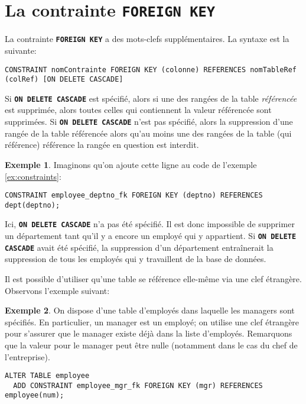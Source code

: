 \documentclass[a4paper, 12pt]{report}
\newcommand{\textSQL}[1]{\texttt{\textbf{#1}}}
\theoremstyle{definition} \newtheorem{ex}{Exemple}
\begin{document}
\section{La contrainte \textSQL{FOREIGN KEY}}
La contrainte \textSQL{FOREIGN KEY} a des mots-clefs supplémentaires. La syntaxe est la suivante:
\begin{lstlisting}[frame=single]
CONSTRAINT nomContrainte FOREIGN KEY (colonne) REFERENCES nomTableRef (colRef) [ON DELETE CASCADE]
\end{lstlisting}

Si \textSQL{ON DELETE CASCADE} est spécifié, alors si une des rangées de la table \emph{référencée} est supprimée, alors toutes celles qui contiennent la valeur référencée sont supprimées. Si \textSQL{ON DELETE CASCADE} n'est pas spécifié, alors la suppression d'une rangée de la table référencée alors qu'au moins une des rangées de la table (qui référence) référence la rangée en question est interdit.

\begin{ex}
Imaginons qu'on ajoute cette ligne au code de l'exemple \ref{ex:constraints}:
\begin{lstlisting}[frame=single]
CONSTRAINT employee_deptno_fk FOREIGN KEY (deptno) REFERENCES dept(deptno);
\end{lstlisting}

Ici, \textSQL{ON DELETE CASCADE} n'a pas été spécifié. Il est donc impossible de supprimer un département tant qu'il y a encore un employé qui y appartient. Si \textSQL{ON DELETE CASCADE} avait été spécifié, la suppression d'un département entraînerait la suppression de tous les employés qui y travaillent de la base de données.
\end{ex}

Il est possible d'utiliser qu'une table se référence elle-même via une clef étrangère. Observons l'exemple suivant:
\begin{ex} \label{ex:fk}
On dispose d'une table d'employés dans laquelle les managers sont spécifiés. En particulier, un manager est un employé; on utilise une clef étrangère pour s'assurer que le manager existe déjà dans la liste d'employés. Remarquons que la valeur pour le manager peut être nulle (notamment dans le cas du chef de l'entreprise).
\begin{lstlisting}[frame=single]
ALTER TABLE employee
  ADD CONSTRAINT employee_mgr_fk FOREIGN KEY (mgr) REFERENCES employee(num);
\end{lstlisting}
\end{ex}
\end{document}
